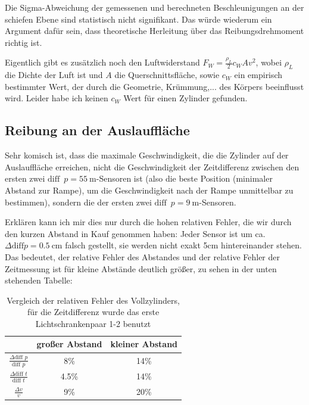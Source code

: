 Die Sigma-Abweichung der gemessenen und berechneten Beschleunigungen an der schiefen Ebene sind statistisch nicht signifikant. Das würde wiederum ein Argument dafür sein, dass theoretische Herleitung über das Reibungsdrehmoment richtig ist.

Eigentlich gibt es zusätzlich noch den Luftwiderstand \(F_W=\frac{\rho_L}{2} c_W A v^2\), wobei \(\rho_L\) die Dichte der Luft ist und \(A\) die Querschnittsfläche, sowie \(c_W\) ein empirisch bestimmter Wert, der durch die Geometrie, Krümmung,... des Körpers beeinflusst wird. Leider habe ich keinen \(c_W\) Wert für einen Zylinder gefunden.  

\subsection{Reibung an der Auslauffläche}
Sehr komisch ist, dass die maximale Geschwindigkeit, die die Zylinder auf der Auslauffläche erreichen, nicht die Geschwindigkeit der Zeitdifferenz zwischen den ersten zwei \(\text{diff }\,p=\qty{55}{\m}\)-Sensoren ist (also die beste Position (minimaler Abstand zur Rampe), um die Geschwindigkeit nach der Rampe unmittelbar zu bestimmen), sondern die der ersten zwei \(\text{diff }\,p=\qty{9}{\m}\)-Sensoren. 

Erklären kann ich mir dies nur durch die hohen relativen Fehler, die wir durch den kurzen Abstand in Kauf genommen haben: Jeder Sensor ist um ca.\(\Delta \text{diff} p=\qty{0.5}{\cm}\) falsch gestellt, sie werden nicht exakt 5cm hintereinander stehen. Das bedeutet, der relative Fehler des Abstandes und der relative Fehler der Zeitmessung ist für kleine Abstände deutlich größer, zu sehen in der unten stehenden Tabelle:\par
\setcellgapes{3pt}
\begin{table}[h]
    \centering\makegapedcells
    \caption{Vergleich der relativen Fehler des Vollzylinders, für die Zeitdifferenz wurde das erste Lichtschrankenpaar 1-2 benutzt}
\begin{tabular}{|c|cc|}\hline
\rule{0pt}{2ex}  &  großer Abstand & kleiner Abstand \\\hline
\(\frac{\Delta \text{diff }p}{\text{diff }p}\) & 8\% & 14\%                 \\
\(\frac{\Delta \text{diff }t}{\text{diff }t}\) &  4.5\% & 14\%                      \\
\(\frac{\Delta v}{v}\) & 9\% & 20\% \\
\hline
\end{tabular}
\label{table:relative Fehler}
\end{table}

